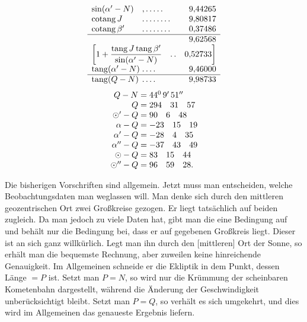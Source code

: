 \[
\begin{array}{l@{\;}l@{\;}r}
\sin(\alpha'-N)&\mathord{,}\,\mathord{.}\,\mathord{.}\,\mathord{.}\,\mathord{.}\,\mathord{.}&9{,}44265\\
\operatorname{cotang}J&\mathord{.}\,\mathord{.}\,\mathord{.}\,\mathord{.}\,\mathord{.}\,\mathord{.}\,\mathord{.}\,\mathord{.}&9{,}80817\\
\operatorname{cotang}\beta'&\mathord{.}\,\mathord{.}\,\mathord{.}\,\mathord{.}\,\mathord{.}\,\mathord{.}\,\mathord{.}\,\mathord{.}&0{,}37486\\\hline
&&9{,}62568\\
\multicolumn{3}{l}{\left[1+\dfrac{\operatorname{tang}J\operatorname{tang}\beta'}{\sin(\alpha'-N)}\quad\mathord{.}\,\mathord{.}\quad0{,}52733\right]}\\
\operatorname{tang}(\alpha'-N)&\mathord{.}\,\mathord{.}\,\mathord{.}\,\mathord{.}&9{,}46000\\\hline
\operatorname{tang}(Q-N)&\mathord{.}\,\mathord{.}\,\mathord{.}\,\mathord{.}&9{,}98733
\end{array}
\]
\[
\begin{array}{r@{\;}l}
Q-N=&44^{0}\,9'\,51''\\
Q=&294\quad31\quad57\\
\odot'-Q=&90\quad6\quad48\\
\alpha-Q=&-23\quad15\quad19\\
\alpha'-Q=&-28\quad4\quad35\\
\alpha''-Q=&-37\quad43\quad49\\
\odot-Q=&83\quad15\quad44\\
\odot''-Q=&96\quad59\quad28.
\end{array}
\]

Die bisherigen Vorschriften sind allgemein. Jetzt muss man entscheiden, welche Beobachtungsdaten man weglassen will. Man denke sich durch den mittleren geozentrischen Ort zwei Großkreise gezogen. Er liegt tatsächlich auf beiden zugleich. Da man jedoch zu viele Daten hat, gibt man die eine Bedingung auf und behält nur die Bedingung bei, dass er auf  gegebenen Großkreis liegt. Dieser ist an sich ganz willkürlich. Legt man ihn durch den [mittleren] Ort der Sonne, so erhält man die bequemste Rechnung, aber zuweilen keine hinreichende Genauigkeit. Im Allgemeinen schneide er die Ekliptik in dem Punkt, dessen Länge \(=P\) ist. Setzt man \(P=N\), so wird nur die Krümmung der scheinbaren Kometenbahn dargestellt, während die Änderung der Geschwindigkeit unberücksichtigt bleibt. Setzt man \(P=Q\), so verhält es sich umgekehrt, und dies wird im Allgemeinen das genaueste Ergebnis liefern.

